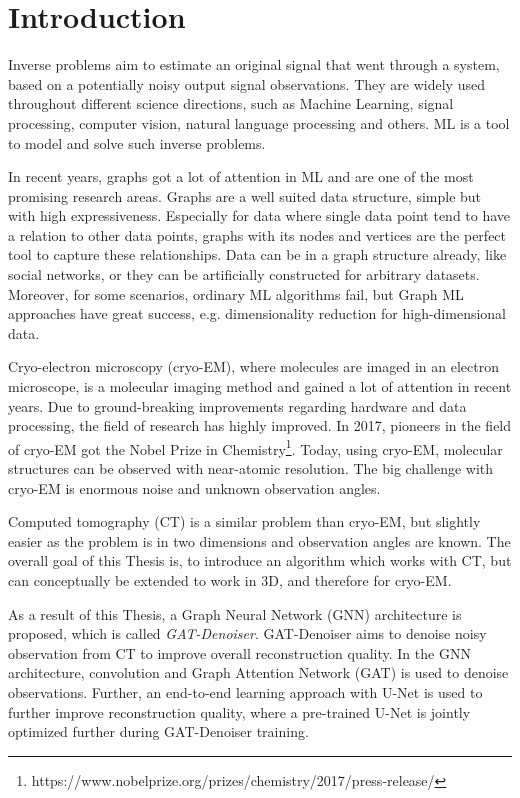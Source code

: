 \chapter{Introduction}
\label{sec:introduction}

Inverse problems aim to estimate an original signal that went through a system, 
based on a potentially noisy output signal observations.
They are widely used throughout different science directions, such as Machine Learning,
signal processing, computer vision, natural language processing and others.
ML is a tool to model and solve such inverse problems.


\bigskip

In recent years, graphs got a lot of attention in ML and are one of the most promising research areas.
Graphs are a well suited data structure, simple but with high expressiveness. 
Especially for data where single data point tend to have a relation to other data points, graphs with its nodes and vertices are the perfect tool
to capture these relationships. 
Data can be in a graph structure already, like social networks, or they can be artificially constructed for arbitrary datasets.
Moreover, for some scenarios, ordinary ML algorithms fail, but Graph ML approaches have great success, e.g. dimensionality reduction for high-dimensional data.


\bigskip

Cryo-electron microscopy (cryo-EM), where molecules are imaged in an electron microscope,
is a molecular imaging method and gained a lot of attention in recent years. 
Due to ground-breaking improvements regarding hardware and data processing, the field of research
has highly improved. In 2017, pioneers in the field of cryo-EM got the 
Nobel Prize in Chemistry\footnote{https://www.nobelprize.org/prizes/chemistry/2017/press-release/}.
Today, using cryo-EM, molecular structures can be observed with near-atomic resolution.
The big challenge with cryo-EM is enormous noise and unknown observation angles.

Computed tomography (CT) is a similar problem than cryo-EM, but slightly easier
as the problem is in two dimensions and observation angles are known.
The overall goal of this Thesis is, to introduce an algorithm which works with CT, but 
can conceptually be extended to work in 3D, and therefore for cryo-EM.

\bigskip

As a result of this Thesis, a Graph Neural Network (GNN) architecture is proposed, which is called \textit{GAT-Denoiser}.
GAT-Denoiser aims to denoise noisy observation from CT to improve overall reconstruction quality.
In the GNN architecture, convolution and Graph Attention Network (GAT) is used to denoise observations.
Further, an end-to-end learning approach with U-Net is used to further improve reconstruction quality, 
where a pre-trained U-Net is jointly optimized further during GAT-Denoiser training.

